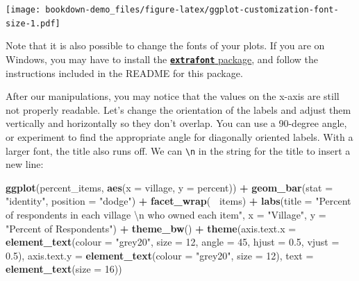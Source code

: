 \documentclass[]{book}
\newenvironment{Shaded}{\begin{snugshade}}{\end{snugshade}}
\newcommand{\KeywordTok}[1]{\textcolor[rgb]{0.13,0.29,0.53}{\textbf{#1}}}
\newcommand{\DataTypeTok}[1]{\textcolor[rgb]{0.13,0.29,0.53}{#1}}
\newcommand{\DecValTok}[1]{\textcolor[rgb]{0.00,0.00,0.81}{#1}}
\newcommand{\FloatTok}[1]{\textcolor[rgb]{0.00,0.00,0.81}{#1}}
\newcommand{\CharTok}[1]{\textcolor[rgb]{0.31,0.60,0.02}{#1}}
\newcommand{\StringTok}[1]{\textcolor[rgb]{0.31,0.60,0.02}{#1}}
\newcommand{\OperatorTok}[1]{\textcolor[rgb]{0.81,0.36,0.00}{\textbf{#1}}}
\newcommand{\NormalTok}[1]{#1}
\begin{document}
\texttt{[image: bookdown-demo\_files/figure-latex/ggplot-customization-font-size-1.pdf]}

Note that it is also possible to change the fonts of your plots. If you
are on Windows, you may have to install the
\href{https://github.com/wch/extrafont}{\textbf{\texttt{extrafont}}
package}, and follow the instructions included in the README for this
package.

After our manipulations, you may notice that the values on the x-axis
are still not properly readable. Let's change the orientation of the
labels and adjust them vertically and horizontally so they don't
overlap. You can use a 90-degree angle, or experiment to find the
appropriate angle for diagonally oriented labels. With a larger font,
the title also runs off. We can \texttt{\textbackslash{}n} in the string
for the title to insert a new line:

\begin{Shaded}
\begin{Highlighting}[]
\KeywordTok{ggplot}\NormalTok{(percent_items, }\KeywordTok{aes}\NormalTok{(}\DataTypeTok{x =}\NormalTok{ village, }\DataTypeTok{y =}\NormalTok{ percent)) }\OperatorTok{+}
\StringTok{    }\KeywordTok{geom_bar}\NormalTok{(}\DataTypeTok{stat =} \StringTok{"identity"}\NormalTok{, }\DataTypeTok{position =} \StringTok{"dodge"}\NormalTok{) }\OperatorTok{+}
\StringTok{    }\KeywordTok{facet_wrap}\NormalTok{(}\OperatorTok{~}\StringTok{ }\NormalTok{items) }\OperatorTok{+}
\StringTok{    }\KeywordTok{labs}\NormalTok{(}\DataTypeTok{title =} \StringTok{"Percent of respondents in each village }\CharTok{\textbackslash{}n}\StringTok{ who owned each item"}\NormalTok{,}
         \DataTypeTok{x =} \StringTok{"Village"}\NormalTok{,}
         \DataTypeTok{y =} \StringTok{"Percent of Respondents"}\NormalTok{) }\OperatorTok{+}
\StringTok{    }\KeywordTok{theme_bw}\NormalTok{() }\OperatorTok{+}
\StringTok{    }\KeywordTok{theme}\NormalTok{(}\DataTypeTok{axis.text.x =} \KeywordTok{element_text}\NormalTok{(}\DataTypeTok{colour =} \StringTok{"grey20"}\NormalTok{, }\DataTypeTok{size =} \DecValTok{12}\NormalTok{, }\DataTypeTok{angle =} \DecValTok{45}\NormalTok{, }\DataTypeTok{hjust =} \FloatTok{0.5}\NormalTok{, }\DataTypeTok{vjust =} \FloatTok{0.5}\NormalTok{),}
          \DataTypeTok{axis.text.y =} \KeywordTok{element_text}\NormalTok{(}\DataTypeTok{colour =} \StringTok{"grey20"}\NormalTok{, }\DataTypeTok{size =} \DecValTok{12}\NormalTok{),}
          \DataTypeTok{text =} \KeywordTok{element_text}\NormalTok{(}\DataTypeTok{size =} \DecValTok{16}\NormalTok{))}
\end{Highlighting}
\end{Shaded}
\end{document}
